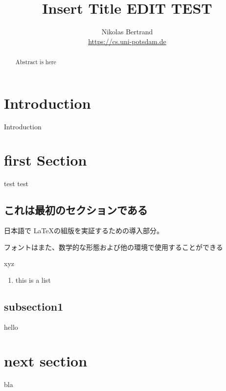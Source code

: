 \documentclass[runningheads]{llncs}
\begin{document}
%
\title{Insert Title EDIT TEST}
%
%
\author{Nikolas Bertrand
%
%
\\
\url{https://cs.uni-potsdam.de}}
%

\maketitle              %
%
\begin{abstract}
Abstract is here

\end{abstract}
%
%
%
\section{Introduction}

Introduction

\section{first Section}
test test
\begin{CJK}{UTF8}{min}
\section{これは最初のセクションである}
日本語で \LaTeX の組版を実証するための導入部分。

フォントはまた、数学的な形態および他の環境で使用することができる
\end{CJK}
xyz
\begin{enumerate}
	\item this is a list
		
\end{enumerate}

 
\subsection{subsection1}
 hello
 \section{next section} 
bla
\end{document}
